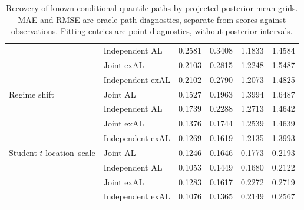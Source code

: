 \begin{table}[p]
\begin{tabular}{@{}>{\raggedright\arraybackslash}p{}>{\raggedright\arraybackslash}p{}rrrr@{}}
 & Independent AL & 0.2581 & 0.3408 & 1.1833 & 1.4584 \\
 & Joint exAL & 0.2103 & 0.2815 & 1.2248 & 1.5487 \\
 & Independent exAL & 0.2102 & 0.2790 & 1.2073 & 1.4825 \\
\addlinespace[2pt]
Regime shift & Joint AL & 0.1527 & 0.1963 & 1.3994 & 1.6487 \\
 & Independent AL & 0.1739 & 0.2288 & 1.2713 & 1.4642 \\
 & Joint exAL & 0.1376 & 0.1744 & 1.2539 & 1.4639 \\
 & Independent exAL & 0.1269 & 0.1619 & 1.2135 & 1.3993 \\
\addlinespace[2pt]
Student-\(t\) location--scale & Joint AL & 0.1246 & 0.1646 & 0.1773 & 0.2193 \\
 & Independent AL & 0.1053 & 0.1449 & 0.1680 & 0.2122 \\
 & Joint exAL & 0.1283 & 0.1617 & 0.2272 & 0.2719 \\
 & Independent exAL & 0.1076 & 0.1365 & 0.2149 & 0.2567 \\
\bottomrule
\end{tabular}
\caption{Recovery of known conditional quantile paths by projected posterior-mean grids. MAE and RMSE are oracle-path diagnostics, separate from scores against observations. Fitting entries are point diagnostics, without posterior intervals.}
\label{tab:joint-qdesn-pure-desn-v2-oracle}
\end{table}

